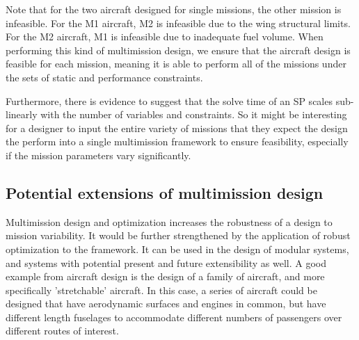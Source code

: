 \begin{center}
    
    \label{t:mmoutputs}
\end{center}

Note that for the two aircraft designed for single missions, the other mission is infeasible. For the M1 aircraft,
M2 is infeasible due to the wing structural limits. For the M2 aircraft, M1 is infeasible due to inadequate
fuel volume. When performing this kind of multimission design, we ensure that the aircraft design is
feasible for each mission,
meaning it is able to perform all of the missions under the sets of static and performance constraints.

Furthermore, there is evidence to suggest that the solve time of an \gls{SP} scales sub-linearly with the number of
variables and constraints. So it might be interesting for a designer to input the entire variety of missions that
they expect the design the perform into a single multimission framework to ensure feasibility, especially if the
mission parameters vary significantly.

\subsection{Potential extensions of multimission design}

Multimission design and optimization increases the robustness of a design to mission variability.
It would be further strengthened by the application of robust optimization to the framework. It can be used in the design
of modular systems, and systems with potential present and future extensibility as well.
A good example from aircraft design
is the design of a family of aircraft, and more specifically 'stretchable' aircraft. In
this case, a series of aircraft could be designed that have aerodynamic surfaces and engines
in common, but have different length fuselages to accommodate different numbers of passengers over different
routes of interest.

